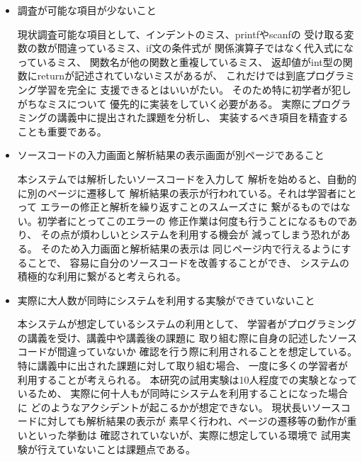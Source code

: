 \documentclass{csspaper}
\begin{document}
      \begin{itemize}
         \item 調査が可能な項目が少ないこと
         
         現状調査可能な項目として、インデントのミス、printfやscanfの
         受け取る変数の数が間違っているミス、if文の条件式が
         関係演算子ではなく代入式になっているミス、
         関数名が他の関数と重複しているミス、
         返却値がint型の関数にreturnが記述されていないミスがあるが、
         これだけでは到底プログラミング学習を完全に
         支援できるとはいいがたい。
         そのため特に初学者が犯しがちなミスについて
         優先的に実装をしていく必要がある。
         実際にプログラミングの講義中に提出された課題を分析し、
         実装するべき項目を精査することも重要である。

         \item ソースコードの入力画面と解析結果の表示画面が別ページであること
         
         本システムでは解析したいソースコードを入力して
         解析を始めると、自動的に別のページに遷移して
         解析結果の表示が行われている。それは学習者にとって
         エラーの修正と解析を繰り返すことのスムーズさに
         繋がるものではない。初学者にとってこのエラーの
         修正作業は何度も行うことになるものであり、
         その点が煩わしいとシステムを利用する機会が
         減ってしまう恐れがある。
         そのため入力画面と解析結果の表示は
         同じページ内で行えるようにすることで、
         容易に自分のソースコードを改善することができ、
         システムの積極的な利用に繋がると考えられる。

         \item 実際に大人数が同時にシステムを利用する実験ができていないこと
         
         本システムが想定しているシステムの利用として、
         学習者がプログラミングの講義を受け、講義中や講義後の課題に
         取り組む際に自身の記述したソースコードが間違っていないか
         確認を行う際に利用されることを想定している。
         特に講義中に出された課題に対して取り組む場合、
         一度に多くの学習者が利用することが考えられる。
         本研究の試用実験は10人程度での実験となっているため、
         実際に何十人もが同時にシステムを利用することになった場合に
         どのようなアクシデントが起こるかが想定できない。
         現状長いソースコードに対しても解析結果の表示が
         素早く行われ、ページの遷移等の動作が重いといった挙動は
         確認されていないが、実際に想定している環境で
         試用実験が行えていないことは課題点である。


\end{itemize}
\end{document}
